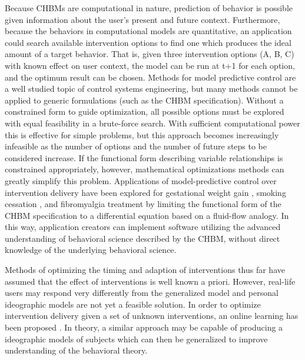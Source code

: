 \documentclass[runningheads,a4paper]{llncs}
\begin{document}
Because CHBMs are computational in nature, prediction of behavior is possible given information about the user's present and future context.
Furthermore, because the behaviors in computational models are quantitative, an application could search available intervention options to find one which produces the ideal amount of a target behavior.
That is, given three intervention options (A, B, C) with known effect on user context, the model can be run at t+1 for each option, and the optimum result can be chosen.
Methods for model predictive control are a well studied topic of control systems engineering, but many methods cannot be applied to generic formulations (such as the CHBM specification).
Without a constrained form to guide optimization, all possible options must be explored with equal feasibility in a brute-force search.
With sufficient computational power this is effective for simple problems, but this approach becomes increasingly infeasible as the number of options and the number of future steps to be considered increase.
If the functional form describing variable relationships is constrained appropriately, however, mathematical optimizations methods can greatly simplify this problem.
Applications of model-predictive control over intervention delivery have been explored for gestational weight gain \cite{dong2013hybrid, dong2014hybrid}, smoking cessation \cite{Timms2014hybrid}, and fibromyalgia treatment \cite{Deshpande2014optimized} by limiting the functional form of the CHBM specification to a differential equation based on a fluid-flow analogy.
In this way, application creators can implement software utilizing the advanced understanding of behavioral science described by the CHBM, without direct knowledge of the underlying behavioral science.

Methods of optimizing the timing and adaption of interventions thus far have assumed that the effect of interventions is well known a priori.
However, real-life users may respond very differently from the generalized model and personal ideographic models are not yet a feasible solution.
In order to optimize intervention delivery given a set of unknown interventions, an online learning has been proposed \cite{jaimes2015calma}.
In theory, a similar approach may be capable of producing a ideographic models of subjects which can then be generalized to improve understanding of the behavioral theory.
\end{document}
